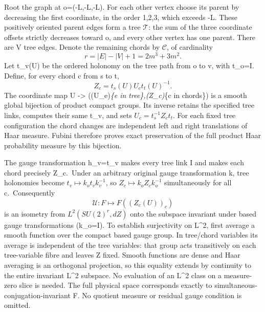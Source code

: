 \documentclass[
  11pt,
]{article}
\begin{document}
Root the graph at o=(-L,-L,-L). For each other vertex choose its parent
by decreasing the first coordinate, in the order 1,2,3, which exceeds
-L. These positively oriented parent edges form a tree \(\mathcal T\):
the sum of the three coordinate offsets strictly decreases toward o, and
every other vertex has one parent. There are \textbar V tree
edges. Denote the remaining chords by \(\mathcal C\), of cardinality \[
 r=|E|-|V|+1=2m^3+3m^2.
\tag{3}
\] Let t\_v(U) be the ordered holonomy on the tree path from o to v,
with t\_o=I. Define, for every chord c from s to t, \[
 Z_c=t_s(U)U_ct_t(U)^{-1}.
\tag{4}
\] The coordinate map U -\textgreater{} ((U\_e)\emph{\{e in
tree\},(Z\_c)}\{c in chords\}) is a smooth global bijection of product
compact groups. Its inverse retains the specified tree links, computes
their same t\_v, and sets \(U_c=t_s^{-1}Z_ct_t\). For each fixed tree
configuration the chord changes are independent left and right
translations of Haar measure. Fubini therefore proves exact preservation
of the full product Haar probability measure by this bijection.

The gauge transformation h\_v=t\_v makes every tree link I and makes
each chord precisely Z\_c.~Under an arbitrary original gauge
transformation k, tree holonomies become \(t_v\mapsto k_ot_vk_v^{-1}\),
so \(Z_c\mapsto k_oZ_ck_o^{-1}\) simultaneously for all c.~Consequently
\[
 \mathcal U:F\longmapsto F((Z_c(U))_c)
\tag{5}
\] is an isometry from \(L^2(SU(2)^r,dZ)\) onto the subspace invariant
under based gauge transformations (k\_o=I). To establish surjectivity on
L\^{}2, first average a smooth function over the compact based gauge
group. In tree/chord variables its average is independent of the tree
variables: that group acts transitively on each tree-variable fibre and
leaves Z fixed. Smooth functions are dense and Haar averaging is an
orthogonal projection, so this equality extends by continuity to the
entire invariant L\^{}2 subspace. No evaluation of an L\^{}2 class on a
measure-zero slice is needed. The full physical space corresponds
exactly to simultaneous-conjugation-invariant F. No quotient measure or
residual gauge condition is omitted.
\end{document}
